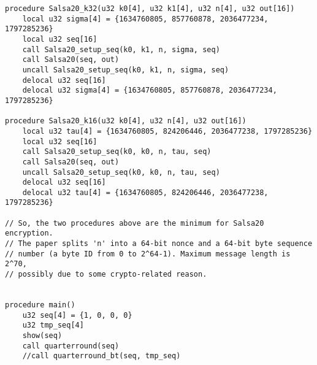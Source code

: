 \documentclass[a4paper,10pt,openright]{memoir}
\begin{document}
\begin{lstlisting}[language=Janus,breaklines=true]
procedure Salsa20_k32(u32 k0[4], u32 k1[4], u32 n[4], u32 out[16])
	local u32 sigma[4] = {1634760805, 857760878, 2036477234, 1797285236}
	local u32 seq[16]
	call Salsa20_setup_seq(k0, k1, n, sigma, seq)
	call Salsa20(seq, out)
	uncall Salsa20_setup_seq(k0, k1, n, sigma, seq)
	delocal u32 seq[16] 
	delocal u32 sigma[4] = {1634760805, 857760878, 2036477234, 1797285236}

procedure Salsa20_k16(u32 k0[4], u32 n[4], u32 out[16])
	local u32 tau[4] = {1634760805, 824206446, 2036477238, 1797285236}
	local u32 seq[16]
	call Salsa20_setup_seq(k0, k0, n, tau, seq)
	call Salsa20(seq, out)
	uncall Salsa20_setup_seq(k0, k0, n, tau, seq)
	delocal u32 seq[16] 
	delocal u32 tau[4] = {1634760805, 824206446, 2036477238, 1797285236}

// So, the two procedures above are the minimum for Salsa20 encryption. 
// The paper splits 'n' into a 64-bit nonce and a 64-bit byte sequence 
// number (a byte ID from 0 to 2^64-1). Maximum message length is 2^70, 
// possibly due to some crypto-related reason.


procedure main()
	u32 seq[4] = {1, 0, 0, 0}
	u32 tmp_seq[4]
	show(seq)
	call quarterround(seq)
	//call quarterround_bt(seq, tmp_seq)
	
\end{lstlisting}
\end{document}
